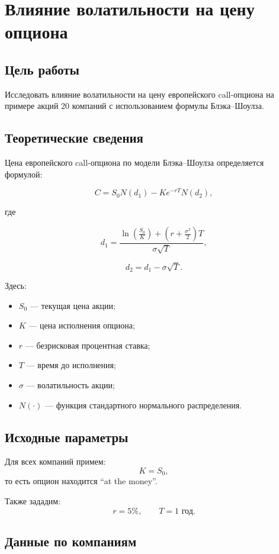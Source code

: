 \section*{Влияние волатильности на цену опциона}

\subsection*{Цель работы}

Исследовать влияние волатильности на цену европейского call-опциона на примере акций 20 компаний с использованием формулы Блэка--Шоулза.

\subsection*{Теоретические сведения}

Цена европейского call-опциона по модели Блэка--Шоулза определяется формулой:

\[
C = S_0 N(d_1) - Ke^{-rT}N(d_2),
\]

где

\[
d_1 = \frac{\ln\left(\frac{S_0}{K}\right)+\left(r+\frac{\sigma^2}{2}\right)T}{\sigma\sqrt{T}},
\]

\[
d_2 = d_1 - \sigma\sqrt{T}.
\]

Здесь:
\begin{itemize}
    \item \(S_0\) --- текущая цена акции;
    \item \(K\) --- цена исполнения опциона;
    \item \(r\) --- безрисковая процентная ставка;
    \item \(T\) --- время до исполнения;
    \item \(\sigma\) --- волатильность акции;
    \item \(N(\cdot)\) --- функция стандартного нормального распределения.
\end{itemize}

\subsection*{Исходные параметры}

Для всех компаний примем:
\[
K=S_0,
\]
то есть опцион находится ``at the money''.

Также зададим:
\[
r=5\%, \qquad T=1 \text{ год}.
\]

\subsection*{Данные по компаниям}

